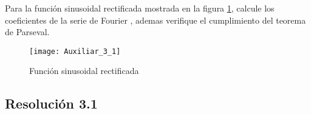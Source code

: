 \documentclass[
  11pt,
  letterpaper,
   addpoints,
   answers
  ]{exam}
\begin{document}
\begin{questions}
\begin{solution}
\end{solution}

\question Para la función sinusoidal rectificada mostrada en la figura \ref{fig:aux3_1}, calcule los coeficientes de la serie de Fourier , ademas verifique el cumplimiento del teorema de Parseval.
\begin{figure}[H]
    \centering
    \texttt{[image: Auxiliar\_3\_1]}
    \caption{Función sinusoidal rectificada}
    \label{fig:aux3_1}
\end{figure}
\begin{solution}
  \subsection*{Resolución 3.1}


\end{solution}
\end{questions}
\end{document}
